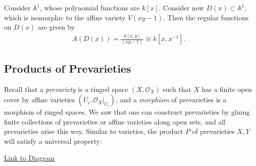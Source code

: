 \begin{example}

Consider \({\mathbb{A}}^1\), whose polynomial functions are \(k[x]\).
Consider now \(D(x) \subset {\mathbb{A}}^1\), which is isomorphic to the
affine variety \(V(xy-1)\). Then the regular functions on \(D(x)\) are
given by
\begin{align*}  
A(D(x)) = 
\frac{ k[x, y] }{ \left\langle{xy-1}\right\rangle } \cong k[x, x^{-1} ]
.\end{align*}

\end{example}

\hypertarget{products-of-prevarieties}{%
\subsection{Products of Prevarieties}\label{products-of-prevarieties}}

Recall that a \emph{prevariety} is a ringed space
\((X, {\mathcal{O}}_X)\) such that \(X\) has a finite open cover by
affine varieties
\((U_i, { \left.{{{\mathcal{O}}_X}} \right|_{{U_i}} })\), and a
\emph{morphism} of prevarieties is a morphism of ringed spaces. We saw
that one can construct prevarieties by gluing finite collections of
prevarieties or affine varieties along open sets, and all prevarieties
arise this way. Similar to varieties, the product \(P\) of prevarieties
\(X, Y\) will satisfy a universal property:

\begin{center}
\end{center}

\href{https://tikzcd.yichuanshen.de/\#N4Igdg9gJgpgziAXAbVABwnAlgFyxMJZABgBpiBdUkANwEMAbAVxiRAAUQBfU9TXfIRQBGUsKq1GLNgC1uvEBmx4CRAExiJ9Zq0QgAGvL7LBRUWq1TdIAJrcJMKAHN4RUADMAThAC2SUSA4EEgAzDwe3n6IAUFIauEgXr7+1LGIZCAMWGDWUHRwABaOINTa0noAOhUwAB5YcDgICUlRGWkaIABGMGBQoRll1lVoWAD6hs2RSG3BiCHU3b1IALQhA1Zsw2N21Ax03Qzs-CpCIJ5YTgU49lxAA}{Link
to Diagram}

